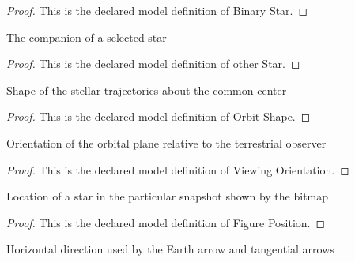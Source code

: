 \begin{proof}
  This is the declared model definition of Binary Star.
\end{proof}
\begin{definition}
  \label{def:physics:phyx-mini-0514:phyxminiproblems-problemphyxmini0514-otherstar}
  The companion of a selected star
\end{definition}
\begin{proof}
  This is the declared model definition of other Star.
\end{proof}
\begin{definition}
  \label{def:physics:phyx-mini-0514:phyxminiproblems-problemphyxmini0514-orbitshape}
  Shape of the stellar trajectories about the common center
\end{definition}
\begin{proof}
  This is the declared model definition of Orbit Shape.
\end{proof}
\begin{definition}
  \label{def:physics:phyx-mini-0514:phyxminiproblems-problemphyxmini0514-viewingorientation}
  Orientation of the orbital plane relative to the terrestrial observer
\end{definition}
\begin{proof}
  This is the declared model definition of Viewing Orientation.
\end{proof}
\begin{definition}
  \label{def:physics:phyx-mini-0514:phyxminiproblems-problemphyxmini0514-figureposition}
  Location of a star in the particular snapshot shown by the bitmap
\end{definition}
\begin{proof}
  This is the declared model definition of Figure Position.
\end{proof}
\begin{definition}
  \label{def:physics:phyx-mini-0514:phyxminiproblems-problemphyxmini0514-horizontaldirection}
  Horizontal direction used by the Earth arrow and tangential arrows
\end{definition}

